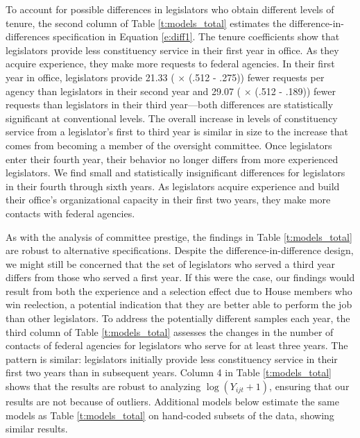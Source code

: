 To account for possible differences in legislators who obtain different levels of tenure, the second column of Table \ref{t:models_total} estimates the difference-in-differences specification in Equation \ref{e:diff1}. The tenure coefficients show that legislators provide less constituency service in their first year in office. As they acquire experience, they make more requests to federal agencies. In their first year in office, legislators provide 21.33 ( $\times$ (.512 - .275)) fewer requests per agency than legislators in their second year and 29.07 ( $\times$ (.512 - .189)) fewer requests than legislators in their third year---both differences are statistically significant at conventional levels. The overall increase in levels of constituency service from a legislator's first to third year is similar in size to the increase that comes from becoming a member of the oversight committee. Once legislators enter their fourth year, their behavior no longer differs from more experienced legislators. We find small and statistically insignificant differences for legislators in their fourth through sixth years. As legislators acquire experience and build their office's organizational capacity in their first two years, they make more contacts with federal agencies.  

As with the analysis of committee prestige, the findings in Table \ref{t:models_total} are robust to alternative specifications. Despite the difference-in-difference design, we might still be concerned that the set of legislators who served a third year differs from those who served a first year. If this were the case, our findings would result from both the experience and a selection effect due to House members who win reelection, a potential indication that they are better able to perform the job than other legislators. To address the potentially different samples each year, the third column of Table \ref{t:models_total} assesses the changes in the number of contacts of federal agencies for legislators who serve for at least three years. The pattern is similar: legislators initially provide less constituency service in their first two years than in subsequent years. Column 4 in Table \ref{t:models_total} shows that the results are robust to analyzing $\log(Y_{ijt} + 1)$, ensuring that our results are not because of outliers. Additional models below estimate the same models as Table \ref{t:models_total} on hand-coded subsets of the data, showing similar results. 


